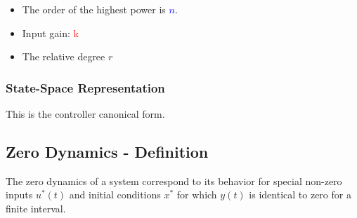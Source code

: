 \documentclass[10pt,a4paper]{scrartcl}
\begin{document}
\begin{multicols*}{3}

\begin{itemize}
\ncompaq
\item The order of the highest power is \textcolor{blue}{$n$}.
\item Input gain: \textcolor{red}{k}
\item The relative degree $r$
\end{itemize}

\subsubsection{State-Space Representation}


This is the controller canonical form.

\subsection{Zero Dynamics - Definition}

The zero dynamics of a system correspond to its behavior for special non-zero inputs $u^\ast(t)$ and initial conditions $x^\ast$ for which $y(t)$ is identical to zero for a finite interval.


\end{multicols*}
\end{document}
